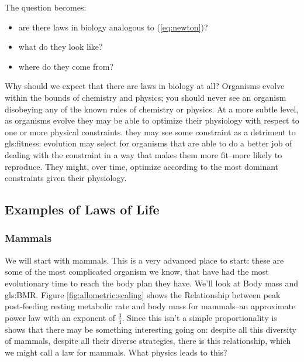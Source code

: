 \documentclass[]{article}
\begin{document}
The question becomes: \begin{itemize}
	\item are there laws in biology analogous to (\ref{eq:newton})? 
	\item what do they look like?
	\item where do they come from?
\end{itemize}

Why should we expect that there are laws in biology at all? Organisms evolve within the bounds of chemistry and physics; you should never see an organism disobeying any of the known rules of chemistry or physics. At a more subtle level, as organisms evolve they may be able to optimize their physiology with respect to one or more physical constraints. they may see some constraint as a detriment to \gls{gls:fitness}: evolution may select for organisms that are able to do a better job of dealing with the constraint in a way that makes them more fit--more likely to reproduce\cite[Chapter 10, An Agony in Five Fits]{dawkins1982extended}. They might, over time, optimize according to the most dominant constraints given their physiology.

\subsection{Examples of Laws of Life}

\subsubsection{Mammals}

We will start with mammals. This is a very advanced place to start: these are some of the most complicated organism we know, that have had the most evolutionary time to reach the body plan they have. We'll look at Body mass and \gls{gls:BMR}.  Figure \ref{fig:allometric:scaling} shows the Relationship between peak post-feeding resting metabolic rate and body mass for mammals--an approximate power law with an exponent of $\frac{3}{4}$. Since this isn't a simple proportionality is shows that there may be something interesting going on: despite all this diversity of mammals, despite all their diverse strategies, there is this relationship, which we might call a law for mammals. What physics leads to this?
\end{document}
